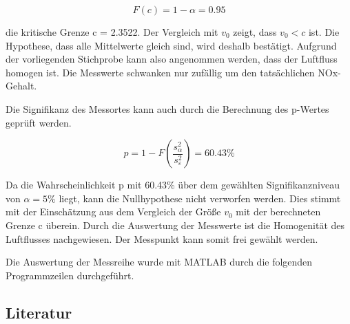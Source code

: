 \begin{equation}\label{eq:ninesixtytwo}
F(c)=1-\alpha =0.95
\end{equation}

\noindent die kritische Grenze c = 2.3522. Der Vergleich mit $v_{0}$ zeigt, dass $v_{0} < c $ ist. Die Hypothese, dass alle Mittelwerte gleich sind, wird deshalb best\"{a}tigt. Aufgrund der vorliegenden Stichprobe kann also angenommen werden, dass der Luftfluss homogen ist. Die Messwerte schwanken nur zuf\"{a}llig um den tats\"{a}chlichen NOx-Gehalt.\newline

\noindent Die Signifikanz des Messortes kann auch durch die Berechnung des p-Wertes gepr\"{u}ft werden. 

\begin{equation}\label{eq:ninesixtythree}
p=1-F\left(\dfrac{s_{\alpha }^{2} }{s_{\varepsilon }^{2} } \right)=60.43\%
\end{equation}

\noindent Da die Wahrscheinlichkeit p mit 60.43\% \"{u}ber dem gew\"{a}hlten Signifikanzniveau von $\alpha = 5\%$ liegt, kann die Nullhypothese nicht verworfen werden. Dies stimmt mit der Einsch\"{a}tzung aus dem Vergleich der Gr\"{o}{\ss}e $v_{0}$ mit der berechneten Grenze c \"{u}berein. Durch die Auswertung der Messwerte ist die Homogenit\"{a}t des Luftflusses nachgewiesen. Der Messpunkt kann somit frei gew\"{a}hlt werden. \newline

\noindent Die Auswertung der Messreihe wurde mit MATLAB durch die folgenden Programmzeilen durchgef\"{u}hrt.



\clearpage

\subsection{Literatur}

